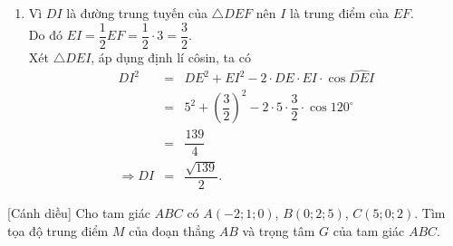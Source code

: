 \begin{bt}[1,5 điểm]
{\begin{enumerate}
			Mà $S_{\triangle DEF} = pr \Rightarrow r = \dfrac{S_{\triangle DEF}}{p} = \dfrac{\dfrac{15\sqrt{3}}{4}}{\dfrac{15}{2}} = \dfrac{\sqrt{3}}{2} \approx 0{,}87$.\\
			Vậy bán kính đường tròn nội tiếp tam giác $DEF$ gần bằng $0{,}87$.
			\item Vì $DI$ là đường trung tuyến của $\triangle DEF$ nên $I$ là trung điểm của $EF$.\\
			Do đó $EI = \dfrac{1}{2}EF = \dfrac{1}{2}\cdot 3 = \dfrac{3}{2}$.\\
			Xét $\triangle DEI$, áp dụng định lí côsin, ta có
			\begin{eqnarray*}
				DI^2 &=& DE^2 + EI^2 - 2\cdot DE\cdot EI\cdot\cos\widehat{DEI}\\
				&=& 5^2 + \left(\dfrac{3}{2}\right)^2 - 2\cdot 5\cdot \dfrac{3}{2}\cdot \cos 120^\circ\\
				&=& \dfrac{139}{4}\\
				\Rightarrow DI &=& \dfrac{\sqrt{139}}{2}.
			\end{eqnarray*}
		\end{enumerate}
	}
\end{bt}

\begin{bt}%
[Cánh diều]
	Cho tam giác $ABC$ có $A(-2;1;0)$, $B(0;2;5)$, $C(5;0;2)$. Tìm tọa độ trung điểm $M$ của đoạn thẳng $AB$ và trọng tâm $G$ của tam giác $ABC$.
\end{bt}

